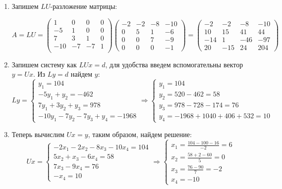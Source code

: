 \documentclass[a4paper,12pt]{article} %
\begin{document}
\begin{enumerate}

\item Запишем $LU$-разложение матрицы:

$
A = LU = \left(\begin{matrix}
1 & 0 & 0 & 0 \\
-5 & 1 & 0 & 0 \\
7 & 3 & 1 & 0 \\
-10 & -7 & -7 & 1 \\
\end{matrix}\right)
\left(\begin{matrix}
-2 & -2 & -8 & -10 \\ 
0 & 5 & 1 & -6 \\ 
0 & 0 & 7 & -9 \\
0 & 0 & 0 & -1 
\end{matrix}\right) =
\left(\begin{matrix}
-2 & -2 & -8 & -10\\ 
10 & 15 & 41 & 44\\ 
-14 & 1 & -46 & -97\\
20 & -15 & 24 & 204  
\end{matrix}\right)
$


\item Запишем систему как $LUx = d$, для удобства введем вспомогательны вектор $y = Ux$. Из $Ly = d$ найдем $y$:
\begin{equation*}
    Ly = 
    \begin{cases}
    y_1 = 104\\
    -5y_1 + y_2 = -462\\
    7y_1 + 3y_2 + y_3 = 978\\
    -10y_1 - 7y_2 - 7y_3 + y_4 = -1968
    \end{cases} 
    \Rightarrow
    \begin{cases}
    y_1 = 104\\
    y_2 = 520 - 462 = 58\\
    y_3 = 978 - 728 - 174 = 76\\
    y_4 = -1968 + 1040 + 406 + 532 = 10
    \end{cases}
\end{equation*}

\item Теперь вычислим $Ux = y$, таким образом, найдем решение:
\begin{equation*}
    Ux = 
    \begin{cases}
    -2x_1 - 2x_2 - 8x_3 - 10x_4 = 104\\
    5x_2 + x_3 - 6x_4 = 58\\
    7x_3 - 9x_4 = 76\\
    -x_4 = 10
    \end{cases} 
    \Rightarrow
    \begin{cases}
    x_1 = \frac{104 - 100 - 16}{-2} = 6\\
    x_2 = \frac{58 + 2 - 60}{5} = 0\\
    x_3 = \frac{76 - 90}{7} = -2\\
    x_4 = -10
    \end{cases}
\end{equation*}


\end{enumerate}
\end{document}
